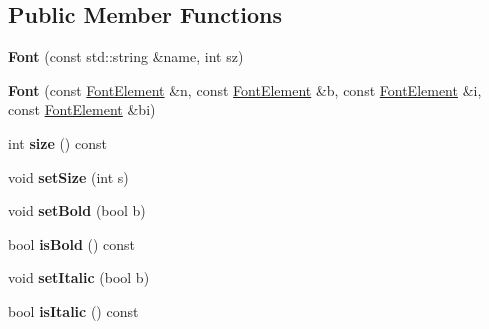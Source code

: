 \subsection*{Public Member Functions}
\begin{DoxyCompactItemize}
\item 
\hypertarget{class_tempest_1_1_font_aa47cbc7fe16d66523df3d4b61259b20e}{{\bfseries Font} (const std\+::string \&name, int sz)}\label{class_tempest_1_1_font_aa47cbc7fe16d66523df3d4b61259b20e}

\item 
\hypertarget{class_tempest_1_1_font_a99661caf6c603f938b11cd0514c4bab3}{{\bfseries Font} (const \hyperlink{class_tempest_1_1_font_element}{Font\+Element} \&n, const \hyperlink{class_tempest_1_1_font_element}{Font\+Element} \&b, const \hyperlink{class_tempest_1_1_font_element}{Font\+Element} \&i, const \hyperlink{class_tempest_1_1_font_element}{Font\+Element} \&bi)}\label{class_tempest_1_1_font_a99661caf6c603f938b11cd0514c4bab3}

\item 
\hypertarget{class_tempest_1_1_font_ac8050327320b0764b39b23e6f7de9211}{int {\bfseries size} () const }\label{class_tempest_1_1_font_ac8050327320b0764b39b23e6f7de9211}

\item 
\hypertarget{class_tempest_1_1_font_a109b219af47717db100f53707e881716}{void {\bfseries set\+Size} (int s)}\label{class_tempest_1_1_font_a109b219af47717db100f53707e881716}

\item 
\hypertarget{class_tempest_1_1_font_a531bd724c393fa176012a27319a33d2c}{void {\bfseries set\+Bold} (bool b)}\label{class_tempest_1_1_font_a531bd724c393fa176012a27319a33d2c}

\item 
\hypertarget{class_tempest_1_1_font_a18807ac4987e8dc12970be679d05f51e}{bool {\bfseries is\+Bold} () const }\label{class_tempest_1_1_font_a18807ac4987e8dc12970be679d05f51e}

\item 
\hypertarget{class_tempest_1_1_font_a5949fac71a2996e307cf06ed1f22ea5a}{void {\bfseries set\+Italic} (bool b)}\label{class_tempest_1_1_font_a5949fac71a2996e307cf06ed1f22ea5a}

\item 
\hypertarget{class_tempest_1_1_font_a81ba6828da30e452ce937d613a6ec991}{bool {\bfseries is\+Italic} () const }\label{class_tempest_1_1_font_a81ba6828da30e452ce937d613a6ec991}


\end{DoxyCompactItemize}
